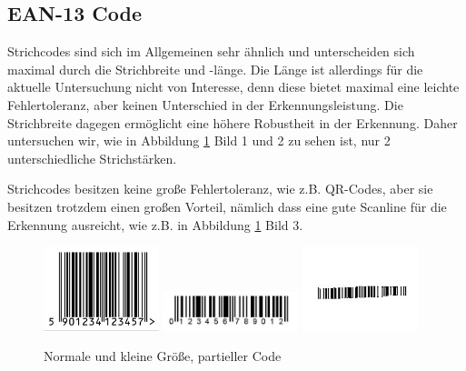 \subsection*{EAN-13 Code}
\writtenby{\dcauthornameriren}%
Strichcodes sind sich im Allgemeinen sehr ähnlich und unterscheiden sich maximal durch die Strichbreite und -länge. Die Länge ist allerdings für die aktuelle Unter\-suchung nicht von Interesse, denn diese bietet maximal eine leichte Fehlertoleranz, aber keinen Unterschied in der Erkennungsleistung. Die Strichbreite dagegen ermöglicht eine höhere Robustheit in der Erkennung. Daher untersuchen wir, wie in Abbild\-ung \ref*{fig:eannormal} Bild 1 und 2 zu sehen ist, nur 2 unterschiedliche Strichstärken. 

Strichcodes besitzen keine große Fehlertoleranz, wie z.B. QR-Codes, aber sie besitz\-en trotzdem einen großen Vorteil, nämlich dass eine gute Scanline für die Erkennung ausreicht, wie z.B. in Abbildung \ref*{fig:eannormal} Bild 3.
\begin{figure}[H]
  \centering
  \includegraphics[width=0.30\textwidth]{img/EAN13/perfect_01.jpg}
  \includegraphics[width=0.35\textwidth]{img/EAN13/perfect_02.jpg}
  \includegraphics[width=0.30\textwidth]{img/EAN13/compensation_01.jpg}
  \caption{Normale und kleine Größe, partieller Code}
  \label{fig:eannormal}
\end{figure}

